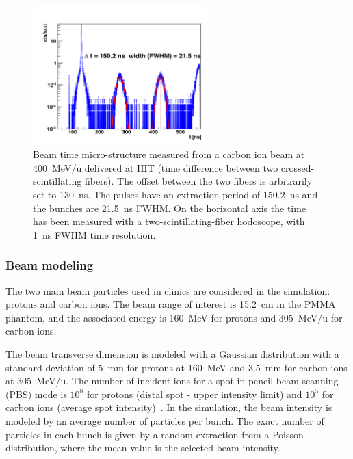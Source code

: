 \begin{figure} [!hbtp]	
  \centering
	\includegraphics[width=0.6\textwidth]{./Figure/BeamTimeStruct.png} 
  \caption{Beam time micro-structure measured from a carbon ion beam at 400~MeV/u delivered at HIT (time difference between two crossed-scintillating fibers). The offset between the two fibers is arbitrarily set to 130~ns. The pulses have an extraction period of 150.2~ns and the bunches are 21.5~ns FWHM.  On the horizontal axis the time has been measured with a two-scintillating-fiber hodoscope, with 1~ns FWHM time resolution.}
  \label{fig:fig_structure_temps_faisceau_HIT_2013_CC_simulation_Hadronth}
\end{figure}


\subsubsection{Beam modeling}\label{beam_modeling}
The two main beam particles used in clinics are considered in the simulation: protons and carbon ions. The beam range of interest is 15.2~cm in the PMMA phantom, and the associated energy is 160~MeV for protons and 305~MeV/u for carbon ions.

The beam transverse dimension is modeled with a Gaussian distribution with a standard deviation of 5~mm for protons at 160~MeV and 3.5~mm for carbon ions at 305~MeV/u. The number of incident ions for a spot in pencil beam scanning (PBS) mode is $10^8$ for protons (distal spot - upper intensity limit) and $10^5$ for carbon ions (average spot intensity)~\cite{Kramer:2000aa, Grevillot_2011,smeets_2012}. In the simulation, the beam intensity is modeled by an average number of particles per bunch. The exact number of particles in each bunch is given by a random extraction from a Poisson distribution, where the mean value is the selected beam intensity.

